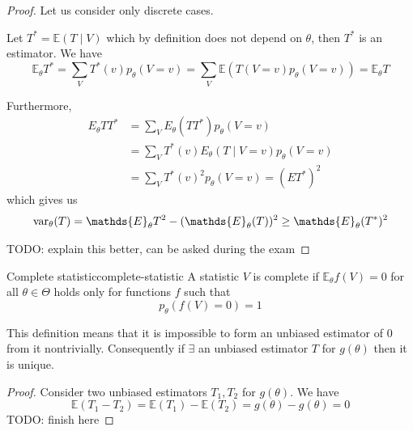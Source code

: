 \documentclass[12pt]{extarticle}
\renewcommand{\var}{{\operatorfont var}}
\newcommand{\E}{\mathds{E}}
\begin{document}
\begin{proof}
    Let us consider only discrete cases.

    Let $T^* = \E(T\mid V)$ which by definition does not depend on $\theta$, then $T^*$ is an estimator.
    We have
    \begin{equation}
        \E_\theta T^* = \sum_V T^* (v) p_\theta(V = v) = \sum_V \E(T(V = v) p_\theta(V = v)) = \E_\theta T
    \end{equation}

    Furthermore,
    \begin{align}
        E_\theta T T^* & = \sum_V E_\theta(T T^*) p_\theta(V = v)                \\
                       & = \sum_V T^*(v) E_\theta(T \mid V = v) p_\theta (V = v) \\
                       & = \sum_V T^*(v)^2 p_\theta(V = v) = (ET^*)^2
    \end{align}
    which gives us
    \begin{equation}
        \var_\theta (T) = \E_\theta T^2 - (\E_\theta(T))^2 \geq \E_\theta (T^*)^2
    \end{equation}

    TODO: explain this better, can be asked during the exam
\end{proof}

\begin{definition}{Complete statistic}{complete-statistic}
    A statistic $V$ is complete if $\E_\theta f(V) = 0$ for all $\theta \in \Theta$
    holds only for functions $f$ such that
    \begin{equation}
        p_\theta(f(V) = 0) = 1
    \end{equation}
\end{definition}

This definition means that it is impossible to form an unbiased estimator of $0$ from it nontrivially.
Consequently if $\exists$ an unbiased estimator $T$ for $g(\theta)$ then it is unique.

\begin{proof}
    Consider two unbiased estimators $T_1, T_2$ for $g(\theta)$.
    We have
    \begin{equation}
        \E(T_1 - T_2) = \E(T_1) - \E(T_2) = g(\theta) - g(\theta) = 0
    \end{equation}
    TODO: finish here
\end{proof}
\end{document}
